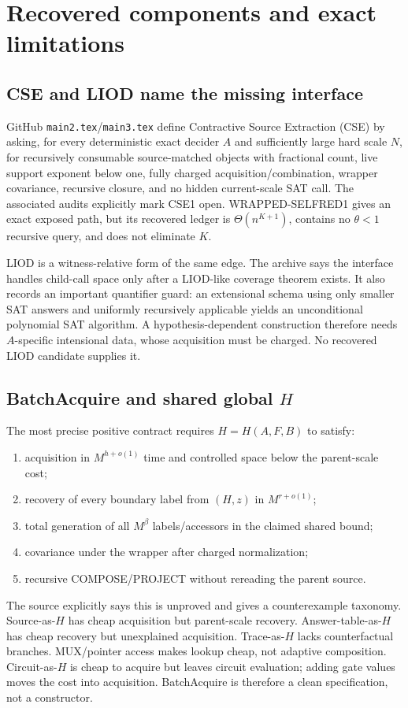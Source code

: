 \documentclass[11pt]{article}
\begin{document}
\section{Recovered components and exact limitations}

\subsection{CSE and LIOD name the missing interface}

GitHub \texttt{main2.tex}/\texttt{main3.tex} define Contractive Source Extraction (CSE) by asking, for every deterministic exact decider $A$ and sufficiently large hard scale $N$, for recursively consumable source-matched objects with fractional count, live support exponent below one, fully charged acquisition/combination, wrapper covariance, recursive closure, and no hidden current-scale SAT call.  The associated audits explicitly mark CSE1 open.  WRAPPED-SELFRED1 gives an exact exposed path, but its recovered ledger is $\Theta(n^{K+1})$, contains no $\theta<1$ recursive query, and does not eliminate $K$.

LIOD is a witness-relative form of the same edge.  The archive says the interface handles child-call space only after a LIOD-like coverage theorem exists.  It also records an important quantifier guard: an extensional schema using only smaller SAT answers and uniformly recursively applicable yields an unconditional polynomial SAT algorithm.  A hypothesis-dependent construction therefore needs $A$-specific intensional data, whose acquisition must be charged.  No recovered LIOD candidate supplies it.

\subsection{BatchAcquire and shared global $H$}

The most precise positive contract requires $H=H(A,F,B)$ to satisfy:
\begin{enumerate}
  \item acquisition in $M^{h+o(1)}$ time and controlled space below the parent-scale cost;
  \item recovery of every boundary label from $(H,z)$ in $M^{r+o(1)}$;
  \item total generation of all $M^\beta$ labels/accessors in the claimed shared bound;
  \item covariance under the wrapper after charged normalization;
  \item recursive COMPOSE/PROJECT without rereading the parent source.
\end{enumerate}
The source explicitly says this is unproved and gives a counterexample taxonomy.  Source-as-$H$ has cheap acquisition but parent-scale recovery.  Answer-table-as-$H$ has cheap recovery but unexplained acquisition.  Trace-as-$H$ lacks counterfactual branches.  MUX/pointer access makes lookup cheap, not adaptive composition.  Circuit-as-$H$ is cheap to acquire but leaves circuit evaluation; adding gate values moves the cost into acquisition.  BatchAcquire is therefore a clean specification, not a constructor.
\end{document}
